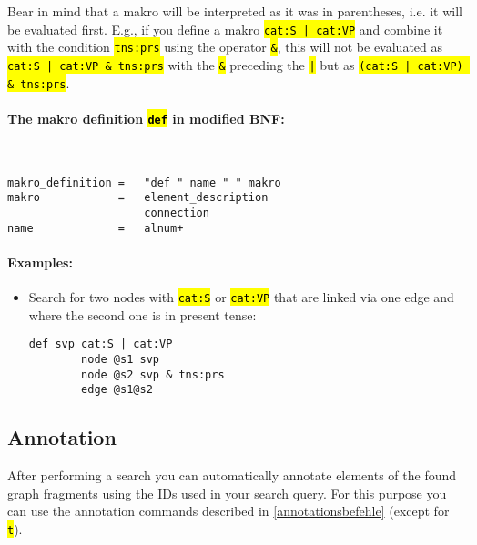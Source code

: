 \documentclass[12pt]{scrartcl}
\newcommand{\code}[1]{\hl{\texttt{#1}}}
\begin{document}
Bear in mind that a makro will be interpreted as it was in parentheses, i.e. it will be evaluated first.
E.g., if you define a makro \code{cat:S | cat:VP} and combine it with the condition \code{tns:prs} using the operator \code{\&}, this will not be evaluated as \code{cat:S | cat:VP \& tns:prs} with the \code{\&} preceding the \code{|} but as \code{(cat:S | cat:VP) \& tns:prs}.

\paragraph*{The makro definition \code{def} in modified BNF:}
~
\begin{lstlisting}
makro_definition =   "def " name " " makro
makro            =   element_description
                     connection
name             =   alnum+
\end{lstlisting}


\paragraph*{Examples:}
\begin{itemize}
	\item Search for two nodes with \code{cat:S} or \code{cat:VP} that are linked via one edge and where the second one is in present tense:
	\begin{lstlisting}[gobble=8,aboveskip=.6em,belowskip=.2em]
		def svp cat:S | cat:VP
		node @s1 svp
		node @s2 svp & tns:prs
		edge @s1@s2
	\end{lstlisting}
\end{itemize}



\subsection{Annotation}\label{query-annotation}

After performing a search you can automatically annotate elements of the found graph fragments using the IDs used in your search query.
For this purpose you can use the annotation commands described in \ref{annotationsbefehle} (except for \code{t}).
\end{document}
